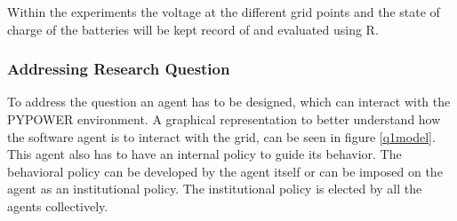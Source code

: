 \documentclass[a4paper]{article}
\begin{document}

Within the experiments the voltage at the different grid points and the state of charge of the batteries will be kept record of and evaluated using R.\\

\subsubsection{Addressing Research Question}
To address the question an agent has to be designed, which can interact with the PYPOWER environment.
A graphical representation to better understand how the software agent is to interact with the grid,
can be seen in figure \ref{q1model}. This agent also has to have an internal policy to guide its behavior. 
The behavioral policy can be developed by the agent itself or can be imposed on the agent as an institutional
policy. The institutional policy is elected by all the agents collectively.  \\
\end{document}
